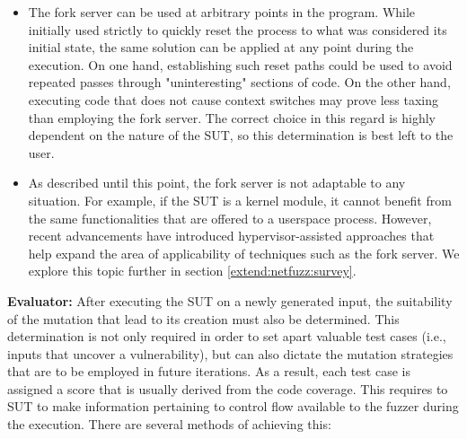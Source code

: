 \begin{itemize}
    \item The fork server can be used at arbitrary points in the program. While initially used strictly to quickly reset the process to what was considered its initial state, the same solution can be applied at any point during the execution. On one hand, establishing such reset paths could be used to avoid repeated passes through "uninteresting" sections of code. On the other hand, executing code that does not cause context switches may prove less taxing than employing the fork server. The correct choice in this regard is highly dependent on the nature of the SUT, so this determination is best left to the user.

    \item As described until this point, the fork server is not adaptable to any situation. For example, if the SUT is a kernel module, it cannot benefit from the same functionalities that are offered to a userspace process. However, recent advancements have introduced hypervisor-assisted approaches that help expand the area of applicability of techniques such as the fork server. We explore this topic further in section \ref{extend:netfuzz:survey}.
\end{itemize}

\textbf{Evaluator:} After executing the SUT on a newly generated input, the suitability of the mutation that lead to its creation must also be determined. This determination is not only required in order to set apart valuable test cases (i.e., inputs that uncover a vulnerability), but can also dictate the mutation strategies that are to be employed in future iterations. As a result, each test case is assigned a score that is usually derived from the code coverage. This requires to SUT to make information pertaining to control flow available to the fuzzer during the execution. There are several methods of achieving this:

